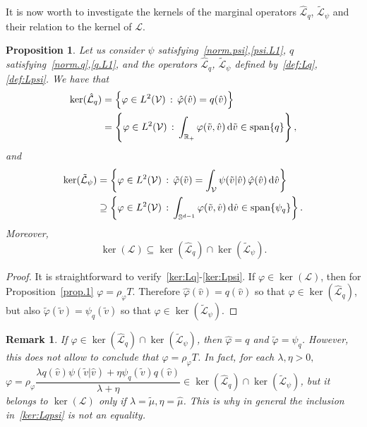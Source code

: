 \documentclass[a4paper]{article}
\theoremstyle{Theorem}\newtheorem{proposition}{Proposition}[section]
\theoremstyle{Remark}\newtheorem{remark}{Remark}[section]
\theoremstyle{Theorem}\newtheorem{theorem}{Theorem}[section]
\newcommand{\R}{\mathbb{R}}
\newcommand{\hv}{\hat{v}}
\newcommand{\tv}{\tilde{v}}
\newcommand{\hphi}{\hat{\varphi}}
\newcommand{\tphi}{\tilde{\varphi}}
\newcommand{\hmu}{\hat{\mu}}
\newcommand{\tmu}{\tilde{\mu}}
\newcommand{\intS}{\int_{\mathbb{S}^{d-1}}}
\newcommand{\intR}{\int_{\R_+}}
\newcommand{\intV}{\int_{\mathcal{V}}}
\begin{document}
It is now worth to investigate the kernels of the marginal operators $\hat{\mathcal{L}}_q$, $\tilde{\mathcal{L}}_{\psi}$ and their relation to the kernel of $\mathcal{L}$.
\begin{proposition} 
Let us consider $\psi$ satisfying~\eqref{norm.psi},\eqref{psi.L1}, $q$ satisfying~\eqref{norm.q},\eqref{q.L1}, and the operators $\hat{\mathcal{L}}_q$, $\tilde{\mathcal{L}}_{\psi}$ defined by~\eqref{def:Lq}, \eqref{def:Lpsi}. We have that
\begin{equation}\label{ker:Lq}
\begin{split}
  \ker (\hat{\mathcal{L}}_q) &= \Big\lbrace \varphi \in L^2(\mathcal{V}) \, : \, \hphi(\hv) =  q(\hv)\Big\rbrace \\
  &= \left\lbrace \varphi \in L^2(\mathcal{V}) \, : \, \intR \varphi(\tv,\hv) \, {\rm d} \tv \in {\rm span}\lbrace q\rbrace\right\rbrace,
  \end{split}
\end{equation}
and
\begin{equation}\label{ker:Lpsi}
\begin{aligned}[b]
  \ker (\tilde{\mathcal{L}}_\psi) &= \left\lbrace \varphi \in L^2(\mathcal{V}) \, : \, \tphi(\tv) =  \intV\psi(\tv|\hv) \, \hphi(\hv) \, {\rm d} \hv \right\rbrace\\ 
  &\supseteq \left\lbrace \varphi \in L^2(\mathcal{V}) \, : \, \intS \varphi(\tv,\hv) \, {\rm d} \hv \in {\rm span}\lbrace \psi_q \rbrace\right\rbrace. 
  \end{aligned}
\end{equation}
Moreover,
\begin{equation}\label{ker:Lqpsi}
         \ker (\mathcal{L}) \subseteq \ker (\hat{\mathcal{L}}_q)  \cap \ker (\tilde{\mathcal{L}}_\psi).
\end{equation}
\end{proposition}
\begin{proof}
It is straightforward to verify~\eqref{ker:Lq}-\eqref{ker:Lpsi}.
If $\varphi \in \ker(\mathcal{L})$, then for Proposition~\ref{prop.1} $\varphi=\rho_\varphi T$. Therefore $\hphi(\hv)=q(\hv)$ so that $\varphi \in\ker(\hat{\mathcal{L}}_q)$, but also $\tphi(\tv)=\psi_q(\tv)$ so that $\varphi \in \ker(\tilde{\mathcal{L}}_\psi)$. 
\end{proof}
\begin{remark}
If $\varphi \in \ker (\hat{\mathcal{L}}_q)  \cap \ker (\tilde{\mathcal{L}}_\psi)$, then $\hphi=q$ and $\tphi=\psi_q$. However, this does not allow to conclude that $\varphi=\rho_\varphi T$. In fact, for each $\lambda, \eta > 0,$ ${\varphi=\rho_\varphi\dfrac{\lambda q(\hv) \psi(\tv|\hv)+ \eta \psi_q(\tv) q(\hv)}{\lambda +\eta} \in \ker (\hat{\mathcal{L}}_q)  \cap \ker (\tilde{\mathcal{L}}_\psi)}$, but it belongs to $\ker(\mathcal{L})$ only if $\lambda=\tmu, \eta=\hmu$.  This is why in general the inclusion in~\eqref{ker:Lqpsi} is not an equality.
\end{remark}
\end{document}
